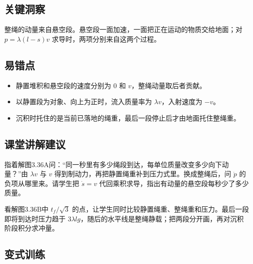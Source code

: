 \documentclass[UTF8,fontset=fandol,a4paper,11pt]{ctexart}
\begin{document}


\subsection*{关键洞察}

整绳的动量来自悬空段。悬空段一面加速，一面把正在运动的物质交给地面；对 $p=\lambda(l-s)v$ 求导时，两项分别来自这两个过程。



\subsection*{易错点}

\begin{itemize}
\item 静置堆积和悬空段的速度分别为 $0$ 和 $v$，整绳动量取后者贡献。
\item 以静置段为对象、向上为正时，流入质量率为 $\lambda v$，入射速度为 $-v$。
\item 沉积时托住的是当前已落地的绳重，最后一段停止后才由地面托住整绳重。
\end{itemize}



\subsection*{课堂讲解建议}

指着解图3.36A问：“同一秒里有多少绳段到达，每单位质量改变多少向下动量？”由 $\lambda v$ 与 $v$ 得到制动力，再把静置绳重补到压力式里。换成整绳后，问 $\dot p$ 的负项从哪里来。请学生把 $\dot s=v$ 代回乘积求导，指出有动量的悬空段每秒少了多少质量。

看解图3.36B中 $t_f/\sqrt3$ 的点，让学生同时比较静置绳重、整绳重和压力。最后一段即将到达时压力趋于 $3\lambda lg$，随后的水平线是整绳静载；把两段分开画，再对沉积阶段积分求冲量。



\subsection*{变式训练}
\end{document}
